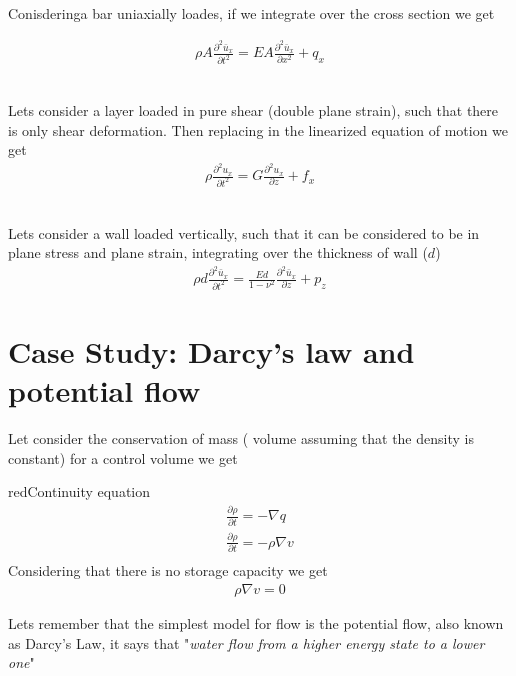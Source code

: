 \documentclass[a4paper, 11pt,article,oneside]{memoir}%
\begin{document}
{}\\
Conisderinga bar uniaxially loades, if we integrate over the cross section we get

\begin{gather*}
\rho A\frac{\partial^2\bar{u}_x}{\partial t^2}=EA\frac{\partial^2 \bar{u}_x}{\partial x^2}+q_x
\end{gather*}


{}\\
Lets consider a layer loaded in pure shear (double plane strain), such that there is only shear deformation.
Then replacing in the linearized equation of motion we get 
\begin{gather*}
\rho \frac{\partial^2 u_x}{\partial t^2}=G\frac{\partial^2 u_x}{\partial z}+f_x
\end{gather*}


{}\\
Lets consider a wall loaded vertically, such that it can be considered to be in plane stress and plane strain, integrating over the thickness of wall ($d$)
\begin{gather*}
\rho d \frac{\partial^2 \bar{u}_x}{\partial t^2}=\frac{Ed}{1-\nu^2}\frac{\partial^2 \bar{u}_x}{\partial z}+p_z
\end{gather*}

\section{Case Study: Darcy's law and potential flow}
Let consider the conservation of mass ( volume assuming that the density is constant) for a control volume we get  
\begin{eqbox2}{red}{Continuity equation}
\begin{gather*}
\frac{\partial \rho}{\partial t}=-\nabla q\\
\frac{\partial \rho}{\partial t}=-\rho \nabla v\\
\end{gather*}
Considering that there is no storage capacity we get
\begin{gather*}
\rho \nabla v=0
\end{gather*}
\end{eqbox2}

Lets remember that the simplest model for flow is the potential flow, also known as Darcy's Law, it says that "\textit{water flow from a higher energy state to a lower one}"
\end{document}

